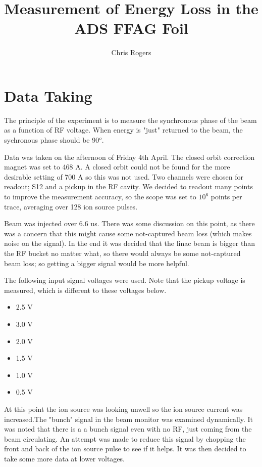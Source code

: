 \documentclass{paper}
\title{Measurement of Energy Loss in the ADS FFAG Foil}
\author{Chris Rogers }
\begin{document}
\maketitle

\section{Data Taking}
The principle of the experiment is to measure the synchronous phase of the beam
as a function of RF voltage. When energy is "just" returned to the beam, the
sychronous phase should be 90$^{o}$.

Data was taken on the afternoon of Friday 4th April. The closed orbit correction 
magnet was set to  468 A. A closed orbit could not
be found for the more desirable setting of 700 A so this was not used. Two 
channels were chosen for readout; S12 and a pickup in the RF cavity. We decided
to readout many points to improve the measurement accuracy, so the scope was set
to $10^6$ points per trace, averaging over 128 ion source pulses.

Beam was injected over 6.6 us. There was some discussion on this  point, as 
there was a concern that this might cause some not-captured beam loss (which makes noise on 
the signal). In the end it was decided that the linac beam is bigger than the RF
bucket no matter what, so there would always be some not-captured beam loss; so
getting a bigger signal would be more helpful.

The following input signal voltages were used. Note that the pickup voltage is
measured, which is different to these voltages below.

\begin{itemize}
\item 2.5 V
\item 3.0 V
\item 2.0 V
\item 1.5 V
\item 1.0 V
\item 0.5 V
\end{itemize}

At this point the ion source was looking unwell so the ion source current was 
increased.The "bunch" signal in the beam monitor was examined dynamically. 
It was noted that there is a a bunch signal even with no RF, just coming from the beam 
circulating. An attempt was made to reduce this signal by chopping the front and 
back of the ion source pulse 
to see if it helps. It was then decided to take some more data at lower voltages.
\end{document}
